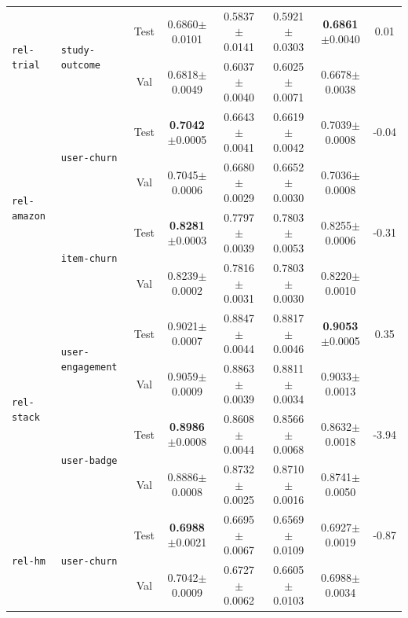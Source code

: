 \documentclass{article} %
\begin{document}
\begin{table}[ht]
{\begin{tabular}{llcccc|cc}
\midrule
\multirow{2}{*}{\texttt{rel-trial}}
 & \multirow{2}{*}{\texttt{study-outcome}} & Test & 0.6860$\pm$0.0101 & 0.5837$\pm$0.0141  & 0.5921$\pm$0.0303 & \textbf{0.6861}$\pm$0.0040 & \cellcolor{lightblue}0.01 \\
 & & Val & 0.6818$\pm$0.0049 & 0.6037$\pm$0.0040 & 0.6025$\pm$0.0071 & 0.6678$\pm$0.0038 &  \\

 \midrule
\multirow{4}{*}{\texttt{rel-amazon}}
 & \multirow{2}{*}{\texttt{user-churn}} & Test & \textbf{0.7042}$\pm$0.0005 & 0.6643$\pm$0.0041 & 0.6619$\pm$0.0042 & 0.7039$\pm$0.0008 & \cellcolor{mediumred}-0.04 \\
 & & Val & 0.7045$\pm$0.0006 & 0.6680$\pm$0.0029 & 0.6652$\pm$0.0030 & 0.7036$\pm$0.0008 &  \\
 & \multirow{2}{*}{\texttt{item-churn}} & Test & \textbf{0.8281}$\pm$0.0003 & 0.7797$\pm$0.0039 & 0.7803$\pm$0.0053 & 0.8255$\pm$0.0006 & \cellcolor{mediumred}-0.31\\
 & & Val & 0.8239$\pm$0.0002 & 0.7816$\pm$0.0031 & 0.7803$\pm$0.0030 & 0.8220$\pm$0.0010 &  \\

 \midrule
\multirow{4}{*}{\texttt{rel-stack}}
 & \multirow{2}{*}{\texttt{user-engagement}} & Test & 0.9021$\pm$0.0007 & 0.8847$\pm$0.0044  & 0.8817$\pm$0.0046 & \textbf{0.9053}$\pm$0.0005 & \cellcolor{lightblue}0.35 \\
 & & Val & 0.9059$\pm$0.0009 & 0.8863$\pm$0.0039 & 0.8811$\pm$0.0034 & 0.9033$\pm$0.0013 &  \\
 & \multirow{2}{*}{\texttt{user-badge}} & Test & \textbf{0.8986}$\pm$0.0008 & 0.8608$\pm$0.0044 & 0.8566$\pm$0.0068 & 0.8632$\pm$0.0018 & \cellcolor{mediumred}-3.94 \\
 & & Val & 0.8886$\pm$0.0008 & 0.8732$\pm$0.0025 & 0.8710$\pm$0.0016 & 0.8741$\pm$0.0050 &  \\

\midrule
\multirow{2}{*}{\texttt{rel-hm}}
 & \multirow{2}{*}{\texttt{user-churn}} & Test & \textbf{0.6988}$\pm$0.0021 & 0.6695$\pm$0.0067 & 0.6569$\pm$0.0109 & 0.6927$\pm$0.0019 &  \cellcolor{mediumred}-0.87\\
 & & Val & 0.7042$\pm$0.0009 & 0.6727$\pm$0.0062 & 0.6605$\pm$0.0103 & 0.6988$\pm$0.0034 &  \\

\bottomrule
\end{tabular}
}
\end{table}


% 
\end{document}
